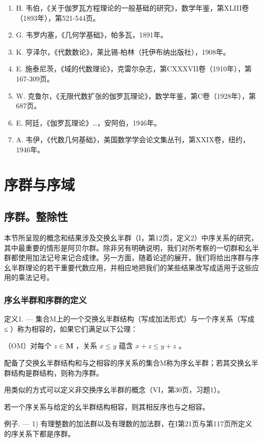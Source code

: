 \begin{enumerate}
\item
  H. 韦伯，《关于伽罗瓦方程理论的一般基础的研究》，数学年鉴，第XLIII卷（1893年），第521-544页。
\item
  G. 韦罗内塞，《几何学基础》，帕多瓦，1891年。
\item
  K. 亨泽尔，《代数数论》，莱比锡-柏林（托伊布纳出版社），1908年。
\item
  E. 施泰尼茨，《域的代数理论》，克雷尔杂志，第CXXXVII卷（1910年），第167-309页。
\item
  W. 克鲁尔，《无限代数扩张的伽罗瓦理论》，数学年鉴，第C卷（1928年），第687页。
\item
  E. 阿廷，《伽罗瓦理论》\ldots，安阿伯，1946年。
\item
  A. 韦伊，《代数几何基础》，美国数学学会论文集丛刊，第XXIX卷，纽约，1946年。
\end{enumerate}

\chapter{序群与序域}

\section{序群。整除性}

本节所呈现的概念和结果涉及交换幺半群（I，第12页，定义2）中序关系的研究，其中最重要的情形是阿贝尔群。除非另有明确说明，我们对所考察的一切群和幺半群都使用加法记号来记合成律。另一方面，随着论述的展开，我们将给出序群与序幺半群理论的若干重要代数应用，并相应地把我们的某些结果改写成适用于这些应用的乘法记号。

\subsection{序幺半群和序群的定义}

定义1. --- 集合M上的一个交换幺半群结构（写成加法形式）与一个序关系（写成 ≤ ）称为相容的，如果它们满足以下公理：

（OM）对每个 \(z \in \mathbf{M}\) ，关系 \(x \leqslant y\) 蕴含 \(x + z \leqslant y + z\) 。

配备了交换幺半群结构和与之相容的序关系的集合M称为序幺半群；若其交换幺半群结构是群结构，则称为序群。

用类似的方式可以定义非交换序幺半群的概念（VI，第30页，习题1）。

若一个序关系与给定的幺半群结构相容，则其相反序也与之相容。

例子. --- 1) 有理整数的加法群以及有理数的加法群，在I第21页与第117页所定义的序关系下都是序群。

